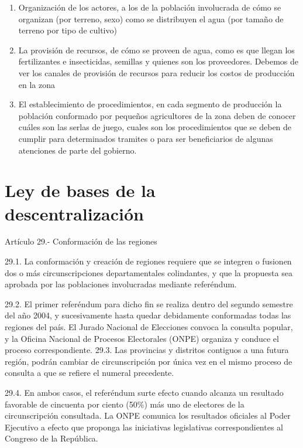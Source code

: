 \documentclass[
  a4paper,
]{article}
\providecommand{\tightlist}{%
  \setlength{\itemsep}{0pt}\setlength{\parskip}{0pt}}\usepackage{longtable,booktabs,array}
\begin{document}
\begin{enumerate}
\def\labelenumi{\arabic{enumi}.}
\tightlist
\item
  Organización de los actores, a los de la población involucrada de cómo
  se organizan (por terreno, sexo) como se distribuyen el agua (por
  tamaño de terreno por tipo de cultivo)
\item
  La provisión de recursos, de cómo se proveen de agua, como es que
  llegan los fertilizantes e insecticidas, semillas y quienes son los
  proveedores. Debemos de ver los canales de provisión de recursos para
  reducir los costos de producción en la zona
\item
  El establecimiento de procedimientos, en cada segmento de producción
  la población conformado por pequeños agricultores de la zona deben de
  conocer cuáles son las serlas de juego, cuales son los procedimientos
  que se deben de cumplir para determinados tramites o para ser
  beneficiarios de algunas atenciones de parte del gobierno.
\end{enumerate}

\section{Ley de bases de la
descentralización}\label{ley-de-bases-de-la-descentralizaciuxf3n}

Artículo 29.- Conformación de las regiones

29.1. La conformación y creación de regiones requiere que se integren o
fusionen dos o más circunscripciones departamentales colindantes, y que
la propuesta sea aprobada por las poblaciones involucradas mediante
referéndum.

29.2. El primer referéndum para dicho fin se realiza dentro del segundo
semestre del año 2004, y sucesivamente hasta quedar debidamente
conformadas todas las regiones del país. El Jurado Nacional de
Elecciones convoca la consulta popular, y la Oficina Nacional de
Procesos Electorales (ONPE) organiza y conduce el proceso
correspondiente. 29.3. Las provincias y distritos contiguos a una futura
región, podrán cambiar de circunscripción por única vez en el mismo
proceso de consulta a que se refiere el numeral precedente.

29.4. En ambos casos, el referéndum surte efecto cuando alcanza un
resultado favorable de cincuenta por ciento (50\%) más uno de electores
de la circunscripción consultada. La ONPE comunica los resultados
oficiales al Poder Ejecutivo a efecto que proponga las iniciativas
legislativas correspondientes al Congreso de la República.
\end{document}
